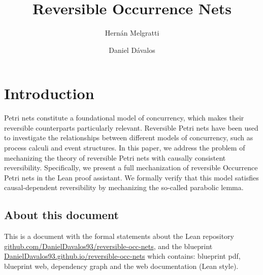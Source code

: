 \documentclass[a4paper]{report}
\title{Reversible Occurrence Nets}
\author{Hernán Melgratti \and Daniel Dávalos}
\begin{document}
\maketitle

\chapter*{Introduction}

Petri nets constitute a foundational model of concurrency,
which makes their reversible counterparts particularly relevant. Reversible
Petri nets have been used to investigate the relationships between different models of concurrency, such as process calculi and event structures.
In this paper, we address the problem of mechanizing the theory of reversible Petri nets with causally consistent reversibility. Specifically, we
present a full mechanization of reversible Occurrence Petri nets in the
Lean proof assistant. We formally verify that this model satisfies causal-dependent reversibility by mechanizing the so-called parabolic lemma.

\section*{About this document}

This is a document with the formal statements about the Lean repository \url{github.com/DanielDavalos93/reversible-occ-nets}, and the blueprint \url{DanielDavalos93.github.io/reversible-occ-nets} which contains: blueprint pdf, blueprint web, dependency graph and the web documentation (Lean style).

\tableofcontents


\end{document}
